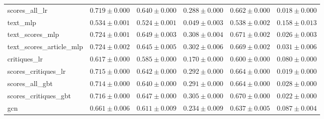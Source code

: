 \begin{table}[t]
\begin{tabular}{lccccc}
scores\_all\_lr & $0.719 \pm 0.000$ & $0.640 \pm 0.000$ & $0.288 \pm 0.000$ & $0.662 \pm 0.000$ & $0.018 \pm 0.000$ \\
text\_mlp & $0.534 \pm 0.001$ & $0.524 \pm 0.001$ & $0.049 \pm 0.003$ & $0.538 \pm 0.002$ & $0.158 \pm 0.013$ \\
text\_scores\_mlp & $0.724 \pm 0.001$ & $0.649 \pm 0.003$ & $0.308 \pm 0.004$ & $0.671 \pm 0.002$ & $0.026 \pm 0.003$ \\
text\_scores\_article\_mlp & $0.724 \pm 0.002$ & $0.645 \pm 0.005$ & $0.302 \pm 0.006$ & $0.669 \pm 0.002$ & $0.031 \pm 0.006$ \\
critiques\_lr & $0.617 \pm 0.000$ & $0.585 \pm 0.000$ & $0.170 \pm 0.000$ & $0.600 \pm 0.000$ & $0.080 \pm 0.000$ \\
scores\_critiques\_lr & $0.715 \pm 0.000$ & $0.642 \pm 0.000$ & $0.292 \pm 0.000$ & $0.664 \pm 0.000$ & $0.019 \pm 0.000$ \\
scores\_all\_gbt & $0.714 \pm 0.000$ & $0.640 \pm 0.000$ & $0.291 \pm 0.000$ & $0.664 \pm 0.000$ & $0.028 \pm 0.000$ \\
scores\_critiques\_gbt & $0.716 \pm 0.000$ & $0.647 \pm 0.000$ & $0.305 \pm 0.000$ & $0.670 \pm 0.000$ & $0.022 \pm 0.000$ \\
gcn & $0.661 \pm 0.006$ & $0.611 \pm 0.009$ & $0.234 \pm 0.009$ & $0.637 \pm 0.005$ & $0.087 \pm 0.004$ \\
\bottomrule
\end{tabular}
\end{table}
